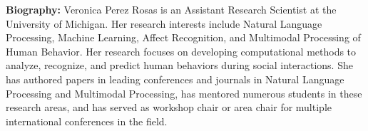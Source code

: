 \vspace{1em}

{\bfseries Biography:}
Veronica Perez Rosas is an Assistant Research Scientist at the University of Michigan. Her research interests include Natural Language Processing, Machine Learning, Affect Recognition, and Multimodal Processing of Human Behavior. Her research focuses on developing computational methods to analyze, recognize, and predict human behaviors during social interactions. She has authored papers in leading conferences and journals in Natural Language Processing and Multimodal Processing, has mentored numerous students in these research areas, and has served as workshop chair or area chair for multiple international conferences in the field.

\newpage
